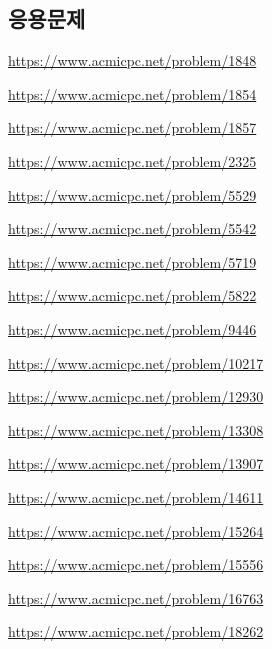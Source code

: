 \subsection{응용문제}
\begin{problem} \url{https://www.acmicpc.net/problem/1848} \end{problem}
\begin{problem} \url{https://www.acmicpc.net/problem/1854} \end{problem}
\begin{problem} \url{https://www.acmicpc.net/problem/1857} \end{problem}
\begin{problem} \url{https://www.acmicpc.net/problem/2325} \end{problem}
\begin{problem} \url{https://www.acmicpc.net/problem/5529} \end{problem}
\begin{problem} \url{https://www.acmicpc.net/problem/5542} \end{problem}
\begin{problem} \url{https://www.acmicpc.net/problem/5719} \end{problem}
\begin{problem} \url{https://www.acmicpc.net/problem/5822} \end{problem}
\begin{problem} \url{https://www.acmicpc.net/problem/9446} \end{problem}
\begin{problem} \url{https://www.acmicpc.net/problem/10217} \end{problem}
\begin{problem} \url{https://www.acmicpc.net/problem/12930} \end{problem}
\begin{problem} \url{https://www.acmicpc.net/problem/13308} \end{problem}
\begin{problem} \url{https://www.acmicpc.net/problem/13907} \end{problem}
\begin{problem} \url{https://www.acmicpc.net/problem/14611} \end{problem}
\begin{problem} \url{https://www.acmicpc.net/problem/15264} \end{problem}
\begin{problem} \url{https://www.acmicpc.net/problem/15556} \end{problem}
\begin{problem} \url{https://www.acmicpc.net/problem/16763} \end{problem}
\begin{problem} \url{https://www.acmicpc.net/problem/18262} \end{problem}

